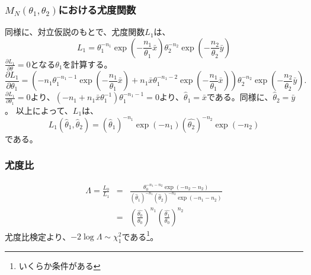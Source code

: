 \subsubsection{$M_N(\theta_1,\theta_2)$における尤度関数}
同様に、対立仮説のもとで、尤度関数$L_{1}$は、
\begin{equation}
    L_{1} = \theta_1^{-n_1}\exp\left(-\frac{n_1}{\theta_1}\bar{x}\right)\theta_2^{-n_2}\exp\left(-\frac{n_2}{\theta_2}\bar{y}\right)
\end{equation}
$\frac{\partial L_1}{\partial\theta}=0$となる$\theta_1$を計算する。
\begin{equation}
    \frac{\partial L_1}{\partial\theta_1}=\left( -n_1\theta_1^{-n_1-1} \exp\left(-\frac{n_1}{\theta_1}\bar{x}\right)+n_1\bar{x}\theta_1^{-n_1-2}\exp\left(-\frac{n_1}{\theta_1}\bar{x}\right)\right)\theta_2^{-n_2}\exp\left(-\frac{n_2}{\theta_2}\bar{y}\right).
\end{equation}
$ \frac{\partial L_1}{\partial\theta_1}=0$より、$(-n_1+n_1\bar{x}\theta_1^{-1})\theta_1^{-n_1-1}=0$より、$\hat{\theta}_1=\bar{x}$である。同様に、$\hat{\theta}_2=\bar{y}$。
以上によって、$L_{1}$は、
\begin{equation}
    L_{1}(\hat{\theta}_1,\hat{\theta}_2) = (\hat{\theta}_1)^{-n_1}\exp(-n_1)(\hat{\theta_2})^{-n_2}\exp(-n_2)
\end{equation}
である。

\subsubsection{尤度比}
\begin{eqnarray}
    \varLambda = \frac{L_{0}}{L_{1}} &=& \frac{ \theta_0^{-n_1-n_2}\exp(-n_2-n_2) }{ (\hat{\theta}_1)^{-n_1}(\hat{\theta}_2)^{-n_2} \exp(-n_1-n_2)}\\
    &=& \left(\frac{\hat{\theta_0}}{\theta_0}\right)^{n_1} \left(\frac{\hat{\theta_1}}{\theta_0} \right)^{n_2}
\end{eqnarray}
尤度比検定より、$-2\log \varLambda \sim\chi^2_1$である\footnote{いくらか条件がある}。

